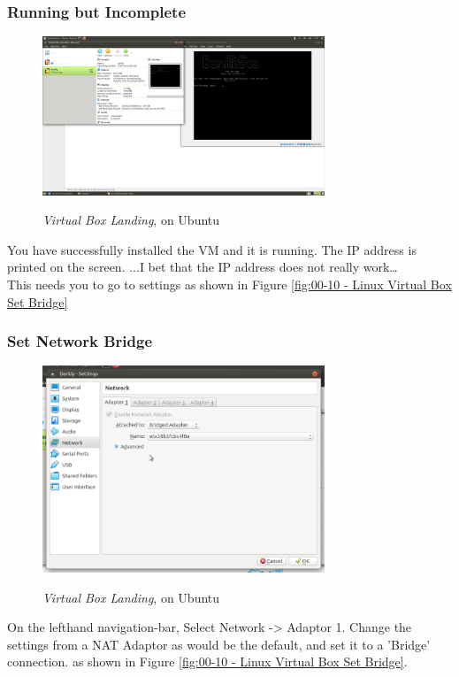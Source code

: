 \subsubsection{Running but Incomplete}
\begin{figure}[!htb]
    \centering
    \includegraphics[width=0.752\textwidth]{images/00-09.png}\\[0cm]  
    \caption[Virtual Box]{\emph{Virtual Box Landing}, on Ubuntu}
    \label{fig:00-09 - Linux Virtual Box Running not complete} 
\end{figure}
You have successfully installed the VM and it is running. The IP address is
printed on the screen. ...I bet that the IP address does not really work\dots\\

This needs you to go to settings as shown in Figure \vref{fig:00-10 - Linux Virtual Box Set Bridge}

\subsubsection{Set Network Bridge}

\begin{figure}[!htb]
    \centering
    \includegraphics[width=0.752\textwidth]{images/00-10.png}\\[0cm]  
    \caption[Virtual Box]{\emph{Virtual Box Landing}, on Ubuntu}
    \label{fig:00-10 - Linux Virtual Box Set Bridge} 
\end{figure}
On the lefthand navigation-bar, Select Network -> Adaptor 1.
Change the settings from a NAT Adaptor as would be the default, and set it
to a 'Bridge' connection. as shown in Figure \vref{fig:00-10 - Linux Virtual Box Set Bridge}.

